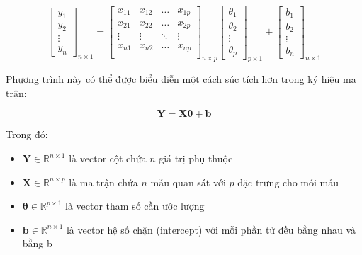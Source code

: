 \[
    \begin{bmatrix}
        y_1 \\
        y_2 \\
        \vdots \\
        y_n
    \end{bmatrix}
    _{\text{$n \times 1$}}
    = 
    \begin{bmatrix}
        x_{11} & x_{12} & \dots & x_{1p} \\
        x_{21} & x_{22} & \dots & x_{2p} \\
        \vdots & \vdots & \ddots & \vdots \\
        x_{n1} & x_{n2} & \dots & x_{np} \\
    \end{bmatrix}
    _{\text{$n \times p$}}
    \begin{bmatrix}
        \theta_{1} \\
        \theta_{2} \\
        \vdots \\
        \theta_{p}
    \end{bmatrix}
    _{\text{$p \times 1$}}
    +
    \begin{bmatrix}
        b_{1} \\
        b_{2} \\
        \vdots \\
        b_{n}
    \end{bmatrix}
    _{\text{$n \times 1$}}
\]

Phương trình này có thể được biểu diễn một cách súc tích hơn trong ký hiệu ma trận:

\begin{equation}
    \label{eq:mlr}
    \mathbf{Y} = \mathbf{X}\boldsymbol{\theta} + \mathbf{b}
\end{equation}

Trong đó:
\begin{itemize}
    \item $\mathbf{Y} \in \mathbb{R}^{n \times 1}$ là vector cột chứa $n$ giá trị phụ thuộc
    \item $\mathbf{X} \in \mathbb{R}^{n \times p}$ là ma trận chứa $n$ mẫu quan sát với $p$ đặc trưng cho mỗi mẫu
    \item $\boldsymbol{\theta} \in \mathbb{R}^{p \times 1}$ là vector tham số cần ước lượng
    \item $\mathbf{b} \in \mathbb{R}^{n \times 1}$ là vector hệ số chặn (intercept) với mỗi phần tử đều bằng nhau và bằng b
\end{itemize}


